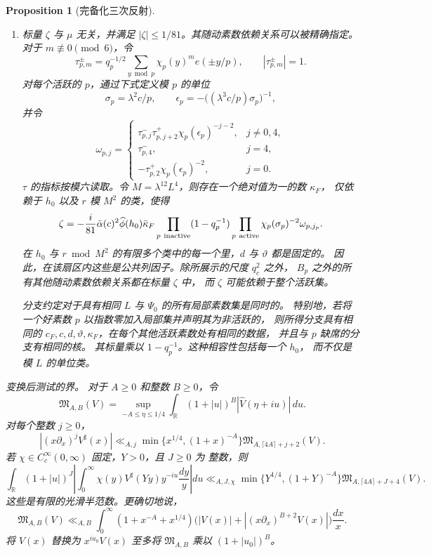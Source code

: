 \documentclass[11pt,a4paper]{article}
\numberwithin{equation}{section}
\numberwithin{figure}{section}
\newtheorem{proposition}[theorem]{Proposition}
\theoremstyle{definition}
\theoremstyle{remark}
\begin{document}
\begin{proposition}[完备化三次反射]
\begin{enumerate}
\item 标量 $\zeta$ 与 $\mu$ 无关，并满足
$|\zeta|\le1/81$。其随动素数依赖关系可以被精确指定。
对于 $m\not\equiv0\pmod6$，令
\[
 \tau_{p,m}^{\pm}=q_p^{-1/2}\sum_{y\bmod p}\chi_p(y)^m e(\pm y/p),
 \qquad |\tau_{p,m}^{\pm}|=1.
\]
对每个活跃的 $p$，通过下式定义模 $p$ 的单位
\[
 \sigma_p=\lambda^2c/p,\qquad
 \epsilon_p=-\big((\lambda^3c/p)\sigma_p\big)^{-1},
\]
并令
\[
 \omega_{p,j}=\begin{cases}
 \tau_{p,j}^{-}\tau_{p,j+2}^{+}\chi_p(\epsilon_p)^{-j-2},&j\ne0,4,\\
 \tau_{p,4}^{-},&j=4,\\
 -\tau_{p,2}^{+}\chi_p(\epsilon_p)^{-2},&j=0.
 \end{cases}
\]
$\tau$ 的指标按模六读取。令
$M=\lambda^{12}L^4$，则存在一个绝对值为一的数 $\kappa_F$，
仅依赖于 $h_0$ 以及 $r$ 模 $M^2$ 的类，使得
\begin{equation}\label{eq:reflection-row-phase}
 \zeta=-\frac i{81}\bar\alpha(c)^2\widehat\phi(h_0)\bar\kappa_F
 \prod_{p\ {\rm inactive}}(1-q_p^{-1})
 \prod_{p\ {\rm active}}\chi_p(\sigma_p)^{-2}\omega_{p,j_p}.
\end{equation}
在 $h_0$ 与 $r\bmod M^2$ 的有限多个类中的每一个里，$d$ 与 $\vartheta$ 都是固定的。
因此，在该扇区内这些是公共列因子。除所展示的尺度 $q_c^2$ 之外，
$B_p$ 之外的所有其他随动素数依赖关系都在标量 $\zeta$ 中，
而 $\zeta$ 可能依赖于整个活跃集。

分支约定对于具有相同 $L$ 与 $\Psi_0$ 的所有局部素数集是同时的。
特别地，若将一个好素数 $p$ 以指数零加入局部集并声明其为非活跃的，
则所得分支具有相同的 $c_F,c,d,\vartheta,\kappa_F$，在每个其他活跃素数处有相同的数据，
并且与 $p$ 缺席的分支有相同的核。
其标量乘以 $1-q_p^{-1}$。这种相容性包括每一个 $h_0$，
而不仅是模 $L$ 的单位类。
\end{enumerate}\emph{变换后测试的界。}
对于 $A\ge0$ 和整数 $B\ge0$，令
\[
 \mathfrak M_{A,B}(V)=
 \sup_{-A\le\eta\le1/4}\int_{\mathbb R}
       (1+|u|)^B|\widehat V(\eta+iu)|\,du.
\]
对每个整数 $j\ge0$，
\begin{equation}\label{eq:reflection-kernel}
 |(x\partial_x)^jV^\sharp(x)|
 \ll_{A,j}\min\{x^{1/4},(1+x)^{-A}\}
       \mathfrak M_{A,\lceil4A\rceil+j+2}(V).
\end{equation}
若 $\chi\in C_c^\infty(0,\infty)$ 固定，$Y>0$，且 $J\ge0$ 为
整数，则
\begin{equation}\label{eq:reflection-annular-fourier}
 \int_{\mathbb R}(1+|u|)^J
 \left|\int_0^\infty\chi(y)V^\sharp(Yy)y^{-iu}\frac{dy}{y}\right|du
 \ll_{A,J,\chi}\min\{Y^{1/4},(1+Y)^{-A}\}
       \mathfrak M_{A,\lceil4A\rceil+J+4}(V).
\end{equation}
这些是有限的光滑半范数。更确切地说，
\begin{equation}\label{eq:reflection-test-seminorm}
 \mathfrak M_{A,B}(V)\ll_{A,B}
 \int_0^\infty(1+x^{-A}+x^{1/4})
       \bigl(|V(x)|+|(x\partial_x)^{B+2}V(x)|\bigr)\frac{dx}{x}.
\end{equation}
将 $V(x)$ 替换为 $x^{iu_0}V(x)$ 至多将
$\mathfrak M_{A,B}$ 乘以 $(1+|u_0|)^B$。
\end{proposition}
\end{document}
